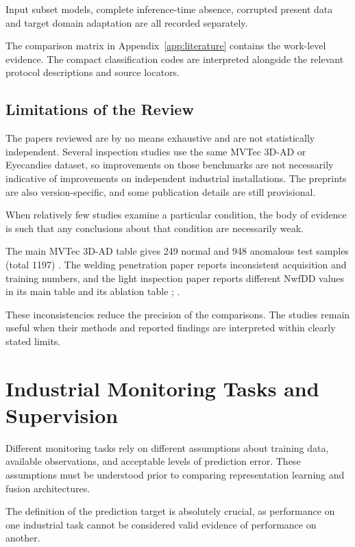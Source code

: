 Input subset models, complete inference-time absence, corrupted present data and target domain
adaptation are all recorded separately.

The comparison matrix in Appendix~\ref{app:literature} contains the work-level evidence. The compact
classification codes are interpreted alongside the relevant protocol descriptions and source
locators.

\subsection{Limitations of the Review}

The papers reviewed are by no means exhaustive and are not statistically independent. Several
inspection studies use the same MVTec 3D-AD or Eyecandies dataset, so improvements on those
benchmarks are not necessarily indicative of improvements on independent industrial installations.
The preprints are also version-specific, and some publication details are still provisional.

When relatively few studies examine a particular condition, the body of evidence is such that any
conclusions about that condition are necessarily weak.

The main MVTec 3D-AD table gives 249 normal and 948 anomalous test samples (total 1197)
\citep[Table~1]{Bergmann2022The}. The welding penetration paper reports inconsistent acquisition and
training numbers, and the light inspection paper reports different NwfDD values in its main table
and its ablation table \citep[PDF pp.~12, 15]{Hua2026Weld}; \citep[PDF p.~10 Tables~IV, VI,
VII]{P035}.

These inconsistencies reduce the precision of the comparisons. The studies remain useful when their
methods and reported findings are interpreted within clearly stated limits.

\section{Industrial Monitoring Tasks and Supervision}

Different monitoring tasks rely on different assumptions about training data, available
observations, and acceptable levels of prediction error. These assumptions must be understood prior
to comparing representation learning and fusion architectures.

The definition of the prediction target is absolutely crucial, as performance on one industrial task
cannot be considered valid evidence of performance on another.

